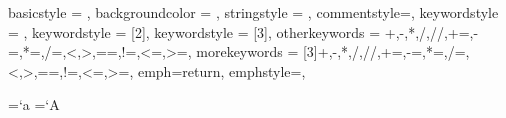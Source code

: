 {
	basicstyle = {\ttfamily \color{main-color}},
	backgroundcolor = {\color{back-color}},
	stringstyle = {\color{string-color}},
	commentstyle=\color{gray},
	keywordstyle = {\color{key-color}},
	keywordstyle = [2]{\color{key-color}},
	keywordstyle = [3]{\color{dkgreen}},
	otherkeywords = {+,-,*,/,//,+=,-=,*=,/=,<,>,==,!=,<=,>=},
	morekeywords = [3]{+,-,*,/,//,+=,-=,*=,/=,<,>,==,!=,<=,>=},
	emph={return},
	emphstyle=\color{lava},
}

\renewcommand{\lstlistingname}{Python Code}
\renewcommand{\lstlistlistingname}{\lstlistingname}
\renewcommand{\labelitemi}{\scriptsize$\blacksquare$}

%	
%	

{
	\sethead
	{}{}{}
	\setheadrule{.4pt}
	
	\setfoot
	{}{\thepage}{}
}

{
	\sethead
	{\toptitlemarks \textit{\thesection} \quad \textit{\sectiontitle}}
	{}
	{\bottitlemarks \textit{\thesection} \quad \textit{\sectiontitle}}
	\setheadrule{.4pt}
	
	\setfoot
	{}{\thepage}{}
}

\DeclarePairedDelimiter\ceil{\lceil}{\rceil}
\DeclarePairedDelimiter\floor{\lfloor}{\rfloor}

\makeatletter
\count@=`a \advance\count@\m@ne
{}
\count@=`A \advance\count@\m@ne
{}
\makeatother

\newcommand{\mybar}[2][3]{{}\mkern#1mu\overline{\mkern-#1mu#2}}
\newcommand{\tild}[2][3]{{}\mkern#1mu\tilde{\mkern-#1mu#2}}
\renewcommand{\bar}{\mybar}
\renewcommand{\labelenumii}{\theenumii}
\renewcommand{\theenumii}{\theenumi.\arabic{enumii}.}